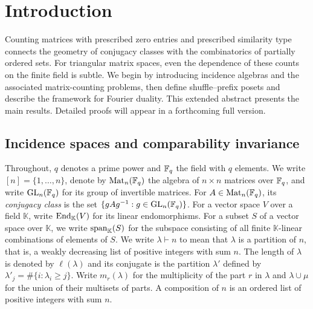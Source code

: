 \section{Introduction}
\label{sec:introduction}
Counting matrices with prescribed zero entries and prescribed similarity
type connects the geometry of conjugacy classes
with the combinatorics of
partially ordered sets. For triangular matrix spaces, even the dependence
of these counts on the finite field is subtle. {
We begin by introducing incidence algebras and the associated matrix-counting
problems, then define shuffle--prefix posets and describe the framework for
Fourier duality.}
This extended abstract presents the main results. Detailed proofs will appear in a forthcoming full version.

\subsection{Incidence spaces and comparability invariance}
Throughout, $q$ denotes a prime power and $\mathbb F_q$ the field with $q$ elements.
{We write $[n]=\{1,\ldots,n\}$, denote by
$\operatorname{Mat}_n(\mathbb F_q)$ the algebra of $n\times n$ matrices over $\mathbb F_q$, and
write $\operatorname{GL}_n(\mathbb F_q)$ for its group of invertible matrices.}
{For $A\in\operatorname{Mat}_n(\mathbb F_q)$, its \emph{conjugacy class}
is the set $\{gAg^{-1}:g\in\operatorname{GL}_n(\mathbb F_q)\}$.}
For a vector space $V$ over a field $\mathbb K$, write
$\operatorname{End}_{\mathbb K}(V)$ for its linear endomorphisms.
{For a subset $S$ of a vector space over $\mathbb K$,
we write $\operatorname{span}_{\mathbb K}(S)$ for the subspace consisting of all finite
$\mathbb K$-linear combinations of elements of $S$.}
{We write $\lambda\vdash n$ to mean that $\lambda$
is a partition of $n$, that is, a weakly decreasing list of positive
integers with sum $n$.} {The length of $\lambda$ is denoted by
$\ell(\lambda)$} and {its conjugate is the partition
$\lambda'$ defined by}
$\lambda'_j=\#\{i:\lambda_i\geq j\}$.
Write $m_r(\lambda)$
for {the multiplicity of the part $r$ in $\lambda$}
and $\lambda\cup\mu$ for the union of their
multisets of parts. A composition of $n$ is an ordered list of positive
integers with sum $n$.



